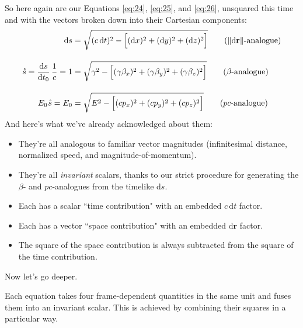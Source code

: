 \documentclass[12pt]{article}
\renewcommand{\vv}[1]{\mathbf{#1}}
\newcommand{\dd}[1]{\mathrm{d}#1}
\begin{document}
So here again are our Equations \ref{eq:24}, \ref{eq:25}, and \ref{eq:26}, unsquared this time and with the vectors broken down into their Cartesian components:
\begin{align*}
\dd s&=\sqrt{(c \, \dd t)^2 - \Bigl[ (\dd x)^2 + (\dd y)^2 + (\dd z)^2 \Bigr]} \tag{$\Vert \dd \vv r \Vert$-analogue} \\[10pt]
\mathring{s} = \dfrac{\dd s}{\dd t_0} \, \dfrac{1}{c} =1&=\sqrt{\gamma^2 - \Bigl[ (\gamma \beta_x)^2 + (\gamma \beta_y)^2 + (\gamma \beta_z)^2 \Bigr]} \tag{$\beta$-analogue} \\[10pt]
E_0 \mkern1mu \mathring{s} = E_0 &=\sqrt{E^2 - \Bigl[ (cp_x)^2 + (cp_y)^2 + (cp_z)^2 \Bigr] } \tag{$p c$-analogue}
\end{align*}
And here's what we've already acknowledged about them:
\begin{itemize}
\item They're all analogous to familiar vector magnitudes (infinitesimal distance, normalized speed, and magnitude-of-momentum).
\item They're all \emph{invariant} scalars, thanks to our strict procedure for generating the $\beta$- and $p c$-analogues from the timelike $\dd s$.
\item Each has a scalar ``time contribution" with an embedded $c\, \dd t$ factor.
\item Each has a vector ``space contribution" with an embedded $\dd \vv r$ factor.
\item The square of the space contribution is always subtracted from the square of the time contribution.
\end{itemize}
Now let's go deeper.

Each equation takes four frame-dependent quantities in the same unit and fuses them into an invariant scalar. This is achieved by combining their squares in a particular way.
\end{document}

